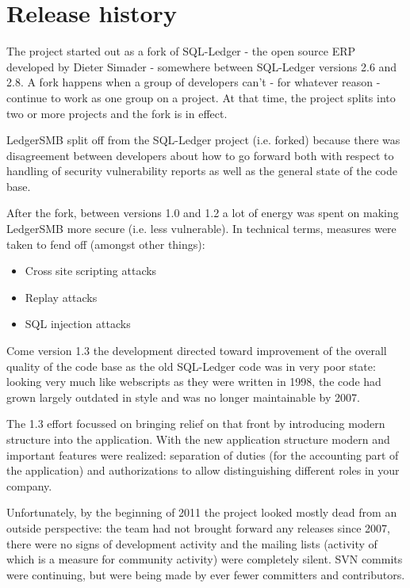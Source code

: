 \section{Release history}

The project started out as a fork of SQL-Ledger - the open source ERP
developed by Dieter Simader - somewhere between SQL-Ledger versions 2.6
and 2.8.  A fork happens when a group of developers can't - for whatever
reason - continue to work as one group on a project.  At that time, the
project splits into two or more projects and the fork is in effect.

LedgerSMB split off from the SQL-Ledger project (i.e. forked) because
there was disagreement between developers about how to go forward both with
respect to handling of security vulnerability reports as well as the general
state of the code base.

After the fork, between versions 1.0 and 1.2 a lot of energy was spent on
making LedgerSMB more secure (i.e. less vulnerable).  In technical terms,
measures were taken to fend off (amongst other things):

\begin{itemize}
\item Cross site scripting attacks
\item Replay attacks
\item SQL injection attacks
\end{itemize}

Come version 1.3 the development directed toward improvement of the overall
quality of the code base as the old SQL-Ledger code was in very poor state:
looking very much like webscripts as they were written in 1998, the code had
grown largely outdated in style and was no longer maintainable by 2007.

The 1.3 effort focussed on bringing relief on that front by introducing
modern structure into the application.  With the new application structure
modern and important features were realized: separation of duties (for the
accounting part of the application) and authorizations to allow distinguishing
different roles in your company.

Unfortunately, by the beginning of 2011 the project looked mostly dead from
an outside perspective: the team had not brought forward any releases since
2007, there were no signs of development activity and the
mailing lists (activity of which is a measure for community activity) were
completely silent.  SVN commits were continuing, but were being made by ever 
fewer committers and contributors.

